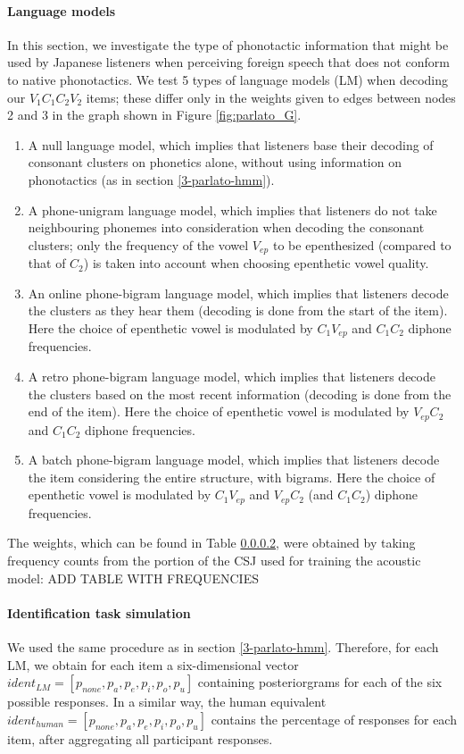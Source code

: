 \paragraph{Language models}
In this section, we investigate the type of phonotactic information that might be used by Japanese listeners when perceiving foreign speech that does not conform to native phonotactics. We test 5 types of language models (LM) when decoding our $V_{1}C_{1}C_{2}V_{2}$ items; these differ only in the weights given to edges between nodes 2 and 3 in the graph shown in Figure \ref{fig:parlato_G}. 
\begin{enumerate}
    \item A null language model, which implies that listeners base their decoding of consonant clusters on phonetics alone, without using information on phonotactics (as in section \ref{3-parlato-hmm}).
    \item A phone-unigram language model, which implies that listeners do not take neighbouring phonemes into consideration when decoding the consonant clusters; only the frequency of the vowel $V_{ep}$ to be epenthesized (compared to that of $C_{2}$) is taken into account when choosing epenthetic vowel quality.
    \item An online phone-bigram language model, which implies that listeners decode the clusters as they hear them (decoding is done from the start of the item). Here the choice of epenthetic vowel is modulated by $C_{1}V_{ep}$ and $C_{1}C_{2}$ diphone frequencies. 
    \item A retro phone-bigram language model, which implies that listeners decode the clusters based on the most recent information (decoding is done from the end of the item). Here the choice of epenthetic vowel is modulated by $V_{ep}C_{2}$ and $C_{1}C_{2}$ diphone frequencies.
    \item A batch phone-bigram language model, which implies that listeners decode the item considering the entire structure, with bigrams. Here the choice of epenthetic vowel is modulated by $C_{1}V_{ep}$ and $V_{ep}C_{2}$ (and $C_{1}C_{2}$) diphone frequencies.  
\end{enumerate}

The weights, which can be found in Table \ref{}, were obtained by taking frequency counts from the portion of the CSJ used for training the acoustic model: 
{\color{red}ADD TABLE WITH FREQUENCIES}


\paragraph{Identification task simulation}
We used the same procedure as in section \ref{3-parlato-hmm}. Therefore, for each LM, we obtain for each item a six-dimensional vector $ident_{LM} = [p_{none}, p_{a}, p_{e}, p_{i}, p_{o}, p_{u}]$ containing posteriorgrams for each of the six possible responses. In a similar way, the human equivalent $ident_{human} = [p_{none}, p_{a}, p_{e}, p_{i}, p_{o}, p_{u}]$ contains the percentage of responses for each item, after aggregating all participant responses. 

